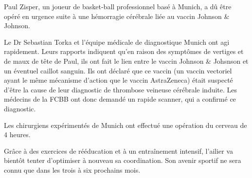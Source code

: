 Paul Zisper, un joueur de basket-ball professionnel basé à Munich, a dû être
opéré en urgence suite à une hémorragie cérébrale liée au vaccin Johnson \&
Johnson.

Le Dr Sebastian Torka et l'équipe médicale de diagnostique Munich ont agi
rapidement. Leurs rapports indiquent qu'en raison des symptômes de vertiges et
de maux de tête de Paul, ils ont fait le lien entre le vaccin Johnson \& Johsnson
et un éventuel caillot sanguin. Ils ont déclaré que ce vaccin (un vaccin
vectoriel ayant le même mécanisme d'action que le vaccin AstraZeneca) était
suspecté d'être la cause de leur diagnostic de thrombose veineuse cérébrale
induite. Les médecins de la FCBB ont donc demandé un rapide scanner, qui a
confirmé ce diagnostic.

Les chirurgiens expérimentés de Munich ont effectué une opération du cerveau de
4 heures.

Grâce à des exercices de rééducation et à un entraînement intensif, l'ailier va
bientôt tenter d'optimiser à nouveau sa coordination. Son avenir sportif ne sera
connu que dans les trois à six prochains mois.
